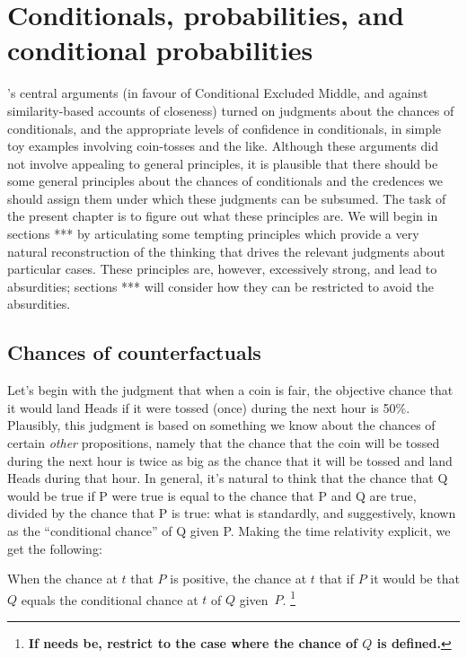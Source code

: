 \documentclass[If.tex]{subfiles}
\begin{document}
\chapter{Conditionals, probabilities, and conditional probabilities}
\label{chap:prob}
\label{sect:equations}
's central arguments (in favour of Conditional Excluded Middle, and against similarity-based accounts of closeness) turned on judgments about the chances of conditionals, and the appropriate levels of confidence in conditionals, in simple toy examples involving coin-tosses and the like. Although these arguments did not involve appealing to general principles, it is plausible that there should be some general principles about the chances of conditionals and the credences we should assign them under which these judgments can be subsumed. The task of the present chapter is to figure out what these principles are.  We will begin in sections *** by articulating some tempting principles which provide a very natural reconstruction of the thinking that drives the relevant judgments about particular cases.  These principles are, however, excessively strong, and lead to absurdities; sections *** will consider how they can be restricted to avoid the absurdities.  

\section{Chances of counterfactuals}\label{sect:chance}
Let's begin with the judgment that when a coin is fair, the objective chance that it would land Heads if it were tossed (once) during the next hour is 50\%. Plausibly, this judgment is based on something we know about the chances of certain \emph{other} propositions, namely that the chance that the coin will be tossed during the next hour is twice as big as the chance that it will be tossed and land Heads during that hour. In general, it's natural to think that the chance that Q would be true if P were true is equal to the chance that P and Q are true, divided by the chance that P is true: what is standardly, and suggestively, known as the “conditional chance” of Q given P. Making the time relativity explicit, we get the following:
\begin{prop}
	 \label{chanceq}
	When the chance at $t$ that $P$ is positive, the chance at $t$ that if $P$ it would be that $Q$ equals the conditional chance at $t$ of $Q$ given~$P$.%
	\footnote{\textbf{If needs be, restrict to the case where the chance of $Q$ is defined.}}
\end{prop}
\end{document}
